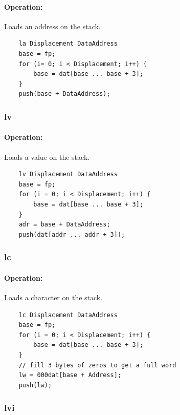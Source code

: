 \paragraph{Operation:}
Loads an address on the stack.

	\begin{lstlisting}
	la Displacement DataAddress
	base = fp;
	for (i= 0; i < Displacement; i++) {
		base = dat[base ... base + 3];
	}
	push(base + DataAddress);
	\end{lstlisting}

\subsubsection{lv}

\paragraph{Operation:}
Loads a value on the stack.

	\begin{lstlisting}
	lv Displacement DataAddress
	base = fp;
	for (i = 0; i < Displacement; i++) {
		base = dat[base ... base + 3];
	}
	adr = base + DataAddress;
	push(dat[addr ... addr + 3]);
	\end{lstlisting}

\subsubsection{lc}

\paragraph{Operation:}
Loads a character on the stack.

	\begin{lstlisting}
	lc Displacement DataAddress
	base = fp;
	for (i = 0; i < Displacement; i++) {
		base = dat[base ... base + 3];
	}
	// fill 3 bytes of zeros to get a full word
	lw = 000dat[base + Address];
	push(lw);
	\end{lstlisting}

\subsubsection{lvi}

